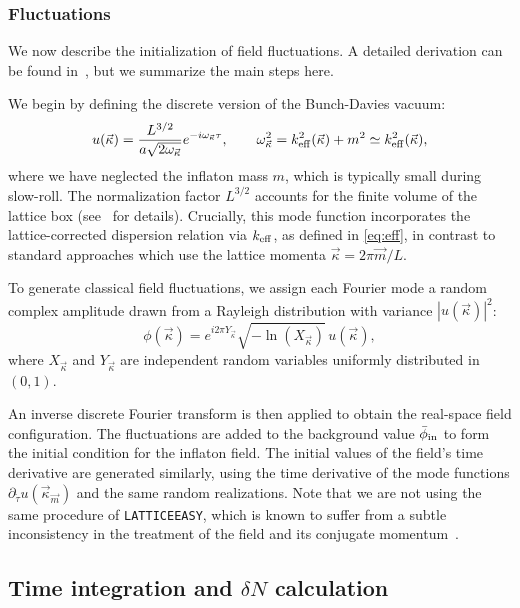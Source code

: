\documentclass[aps, nofootinbib,superscriptaddress, preprintnumbers, longbibliography]{article}
\begin{document}
\subsubsection{Fluctuations}

We now describe the initialization of field fluctuations. A detailed derivation can be found in~\cite{Caravano:2022yyv}, but we summarize the main steps here.

We begin by defining the discrete version of the Bunch-Davies vacuum:
\begin{equation}
\label{eq:discBD}
u(\vec\kappa) = \frac{L^{3/2}}{a \sqrt{2 \omega_{\vec\kappa}}} e^{-i \omega_{\vec\kappa} \tau}, \quad\quad \omega_{\vec\kappa}^2 = k_{\rm eff}^2(\vec\kappa) + m^2 \simeq k_{\rm eff}^2(\vec\kappa),
\end{equation}
where we have neglected the inflaton mass $m$, which is typically small during slow-roll. The normalization factor $L^{3/2}$ accounts for the finite volume of the lattice box (see~\cite{Caravano:2022yyv} for details). Crucially, this mode function incorporates the lattice-corrected dispersion relation via $k_{\rm eff}$, as defined in \cref{eq:eff}, in contrast to standard approaches which use the lattice momenta $\vec{\kappa} = 2\pi \vec{m} / L$.

To generate classical field fluctuations, we assign each Fourier mode a random complex amplitude drawn from a Rayleigh distribution with variance $|u(\vec\kappa)|^2$:
\begin{equation}
\label{eq:randommodes}
\phi(\vec\kappa) = e^{i 2\pi Y_{\vec{\kappa}}} \sqrt{-\ln(X_{\vec{\kappa}})} \, u(\vec\kappa),
\end{equation}
where $X_{\vec{\kappa}}$ and $Y_{\vec{\kappa}}$ are independent random variables uniformly distributed in $(0, 1)$. 

An inverse discrete Fourier transform is then applied to obtain the real-space field configuration. The fluctuations are added to the background value $\bar{\phi}_{\rm in}$ to form the initial condition for the inflaton field. The initial values of the field’s time derivative are generated similarly, using the time derivative of the mode functions $\partial_{\tilde\tau} u(\vec\kappa_{\vec{m}})$ and the same random realizations. Note that we are not using the same procedure of \texttt{LATTICEEASY}, which is known to suffer from a subtle inconsistency in the treatment of the field and its conjugate momentum~\cite{Frolov_2008}.

\subsection{Time integration and \texorpdfstring{$\delta N$}{deltaN} calculation}
\end{document}
